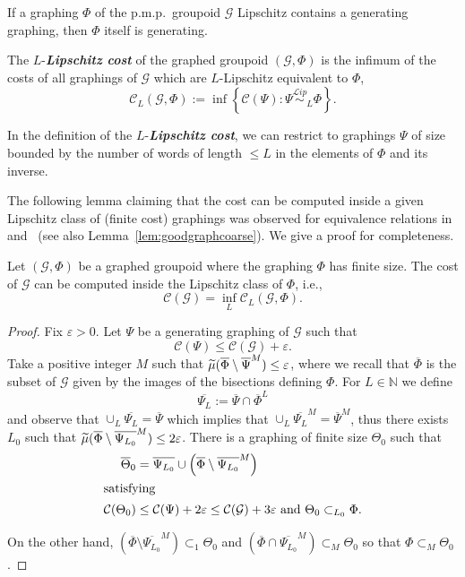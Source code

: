 \documentclass[AHL,Unicode,longabstracts,published]{cedram}
\newcommand{\defin}[1]{\textbf{\emph{#1}}}
\newcommand{\Nmath}{\mathbb{N}}
\newcommand{\cost}{\mathcal{C}}
\newcommand{\cg}{\mathcal{G}}
\newcommand{\eps}{\varepsilon}
\newcommand{\pmp}{p.m.p.\ }
\newcommand\Lipeq{\overset{\mathcal{L}ip}{\sim}}
\let\oldtilde\tilde
\renewcommand*{\tilde}[1]{\mathchoice{\widetilde{#1}}{\widetilde{#1}}{\oldtilde{#1}}{\oldtilde{#1}}}
\begin{document}
If a graphing $\Phi$ of the \pmp groupoid $\cg$ Lipschitz contains a generating graphing, then $\Phi$ itself is generating.

The $L$-\defin{Lipschitz cost} of the graphed groupoid $(\cg,\Phi)$ is the infimum of the costs of all graphings of $\cg$ which are $L$-Lipschitz equivalent to $\Phi$,
\[
\cost_L(\cg,\Phi):=\inf\left\{\cost(\Psi)\colon \Psi\Lipeq_L\Phi \right\}.
\]

\begin{rema}\label{rem:for_Lipschitz_cost}
In the definition of the $L$-\defin{Lipschitz cost}, we can restrict to graphings $\Psi$ of size bounded by the number of words of length $\leq L$ in the elements of $\Phi$ and its inverse.
\end{rema}

The following lemma claiming that the cost can be computed inside a given Lipschitz class of (finite cost) graphings was observed for equivalence relations in~\cite[Étape 1]{Gab-CRAS-cost} and~\cite{Gab-cost} (see also Lemma~\ref{lem:goodgraphcoarse}). We give a proof for completeness.
\begin{lemm}\label{lem:goodgraph}
Let $(\cg,\Phi)$ be a graphed groupoid where the graphing $\Phi$ has finite size. The cost of $\cg$ can be computed inside the Lipschitz class of $\Phi$, i.e.,
\begin{equation}
\cost(\cg)=\inf_L\cost_L(\cg,\Phi).
\end{equation}
\end{lemm}
\begin{proof}
Fix $\eps>0$. Let $\Psi$ be a generating graphing of $\cg$ such that
\[
\cost(\Psi)\leq \cost(\cg)+\eps.
\]
Take a positive integer $M$ such that $\tilde\mu(\overline\Phi\setminus\overline\Psi^M)\leq\eps$, where we recall that $\overline\Phi$ is the subset of $\cg$ given by the images of the bisections defining $\Phi$. For $L\in\Nmath$ we define
\[
\overline{\Psi_L}:=\overline\Psi\cap \overline{\Phi}^L
\]
and observe that $\cup_L \overline{\Psi_L}=\overline\Psi$ which implies that $\cup_L \overline{\Psi_L}^M=\overline\Psi^M$, thus there exists $L_0$ such that $\tilde\mu(\overline\Phi\setminus \overline{\Psi_{L_0}}^M)\leq 2\eps$. There is a graphing of finite size $\Theta_0$ such that
\begin{align*}
\overline\Theta_0 &=\overline {\Psi_{L_0}}\cup\left(\overline\Phi\setminus \overline{\Psi_{L_0}}^M\right)\\
\intertext{satisfying}
\cost(\Theta_0)&\leq \cost(\Psi)+2\eps\leq \cost(\cg)+3\eps\text{ and }\Theta_0\subset_{L_0}\Phi.
\end{align*}

On the other hand, $(\overline\Phi\setminus \overline{\Psi_{L_0}}^M)\subset_1 \Theta_0$ and $(\overline\Phi\cap \overline{\Psi_{L_0}}^M)\subset_{M} \Theta_0$ so that $\Phi\subset_M \Theta_0$.
\end{proof}
\end{document}
